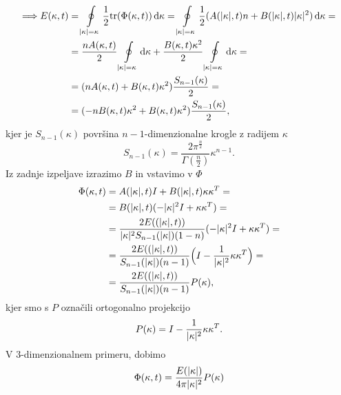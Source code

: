 \documentclass[mat2, tisk]{fmfdelo}
\newcommand{\bd}{\textbf}
\begin{document}
\begin{align*}
  \Longrightarrow E(\kappa, t) &= \oint\limits_{|\text{\bd{$\kappa$}}| = \kappa} \frac{1}{2} \text{tr}(\Phi(\text{\bd{$\kappa$}}, t)) \dif \text{\bd{$\kappa$}} = \oint\limits_{|\text{\bd{$\kappa$}}| = \kappa} \frac{1}{2} (A(|\text{\bd{$\kappa$}}|, t) n + B(|\text{\bd{$\kappa$}}|, t) |\text{\bd{$\kappa$}}|^2) \dif \text{\bd{$\kappa$}} = \\
&= \frac{n A(\kappa, t)}{2} \oint\limits_{|\text{\bd{$\kappa$}}| = \kappa} \dif \text{\bd{$\kappa$}} + \frac{B(\kappa, t) \kappa^2}{2} \oint\limits_{|\text{\bd{$\kappa$}}| = \kappa} \dif \text{\bd{$\kappa$}} = \\
&= ({n A(\kappa, t)} + {B(\kappa, t) \kappa^2}) \frac{S_{n-1}(\kappa)}{2} = \\
&= ({- n B(\kappa, t)}\kappa^2 + {B(\kappa, t) \kappa^2}) \frac{S_{n-1}(\kappa)}{2},
\end{align*}
kjer je $S_{n-1}(\kappa)$ površina $n-1$-dimenzionalne krogle z radijem
$\kappa$ 
$$
S_{n-1}(\kappa) = \frac{2\pi^{\frac{n}{2}}}{\Gamma(\frac{n}{2})} \kappa^{n-1}.
$$
Iz zadnje izpeljave izrazimo $B$ in vstavimo v $\Phi$
\begin{align}
  \Phi(\text{\bd{$\kappa$}}, t) &= A(|\text{\bd{$\kappa$}}|, t) I + B(|\text{\bd{$\kappa$}}|, t) \text{\bd{$\kappa$}} \text{\bd{$\kappa$}}^T = \nonumber\\
  &= B(|\text{\bd{$\kappa$}}|, t) (-|\text{\bd{$\kappa$}}|^2 I + \text{\bd{$\kappa$}} \text{\bd{$\kappa$}}^T) = \nonumber\\
  &= \frac{2E((|\text{\bd{$\kappa$}}|, t))}{|\text{\bd{$\kappa$}}|^2 S_{n-1}(|\text{\bd{$\kappa$}}|)(1-n)} (-|\text{\bd{$\kappa$}}|^2 I + \text{\bd{$\kappa$}} \text{\bd{$\kappa$}}^T) = \nonumber\\
  &= \frac{2E((|\text{\bd{$\kappa$}}|, t))}{S_{n-1}(|\text{\bd{$\kappa$}}|)(n-1)} \Big(I - \frac{1}{|\text{\bd{$\kappa$}}|^2}\text{\bd{$\kappa$}} \text{\bd{$\kappa$}}^T\Big) = \nonumber\\
  &= \frac{2E((|\text{\bd{$\kappa$}}|, t))}{S_{n-1}(|\text{\bd{$\kappa$}}|)(n-1)} P(\text{\bd{$\kappa$}}),
\label{hitrostno_spektralni_tenzor_izotropija}
\end{align}
kjer smo s $P$ označili ortogonalno projekcijo 
$$
P(\text{\bd{$\kappa$}}) = I - \frac{1}{|\text{\bd{$\kappa$}}|^2}\text{\bd{$\kappa$}} \text{\bd{$\kappa$}}^T.
$$
V $3$-dimenzionalnem primeru, dobimo 
\begin{equation}
\Phi(\text{\bd{$\kappa$}}, t) = \frac{E(|\text{\bd{$\kappa$}}|)}{4\pi |\text{\bd{$\kappa$}}|^2}P(\text{\bd{$\kappa$}})
\end{equation}
\end{document}
